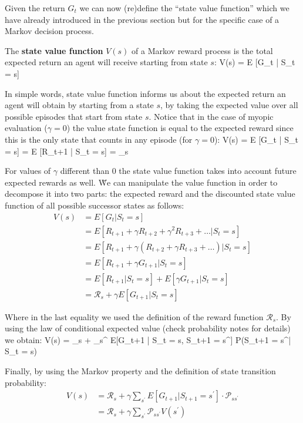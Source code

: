 Given the return $G_t$ we can now (re)define the ``state value function'' which we have already introduced in the 
previous section but for the specific case of a Markov decision process.

The \textbf{state value function } $V(s)$ of a Markov reward process is the total expected return an agent will 
receive starting from state $s$:
\bse
V(s) = E [G_t | S_t = s]
\ese
\ed

In simple words, state value function informs us about the expected return an agent will obtain by starting from a 
state $s$, by taking the expected value over all possible episodes that start from state $s$. Notice that in the 
case of myopic evaluation ($\gamma=0$) the value state function is equal to the expected reward since this is the 
only state that counts in any episode (for $\gamma=0$):
\bse
V(s) = E [G_t | S_t = s] = E [R_{t+1} | S_t = s] = _{s}
\ese

For values of $\gamma$ different than 0 the state value function takes into account future expected rewards as well. \v

We can manipulate the value function in order to decompose it into two parts: the expected reward and the discounted 
state value function of all possible successor states as follows:
{\setlength{\jot}{10pt}
\begin{align*}
V(s) &= E [G_t | S_t = s] \\
&= E [R_{t+1} + \gamma R_{t+2} + \gamma^2 R_{t+3} + \ldots | S_t = s] \\
&= E [R_{t+1} + \gamma (R_{t+2} + \gamma R_{t+3} + \ldots) | S_t = s] \\
&= E [R_{t+1} + \gamma G_{t+1} | S_t = s] \\
&= E [R_{t+1}| S_t = s] + E[\gamma G_{t+1} | S_t = s] \\
&= \mathcal{R}_{s} + \gamma E[G_{t+1} | S_t = s]
\end{align*}}

\vspace{-10pt}

Where in the last equality we used the definition of the reward function $\mathcal{R}_{s}$. By using the law of 
conditional expected value (check probability notes for details) we obtain:
\bse
V(s) = _{s} + \gamma \sum_{s^\prime} E[G_{t+1} | S_t = s, S_{t+1} = s^\prime] 
\cdot P(S_{t+1} = s^\prime | S_t = s)
\ese

Finally, by using the Markov property and the definition of state transition probability:
{\setlength{\jot}{10pt}
\begin{align*}
V(s) &= \mathcal{R}_{s} + \gamma \sum_{s^\prime} E[G_{t+1} | S_{t+1} = s^\prime] \cdot \mathcal{P}_{ss^\prime} \\
&= \mathcal{R}_{s} + \gamma \sum_{s^\prime} \mathcal{P}_{ss^\prime} V(s^\prime)
\end{align*}}

